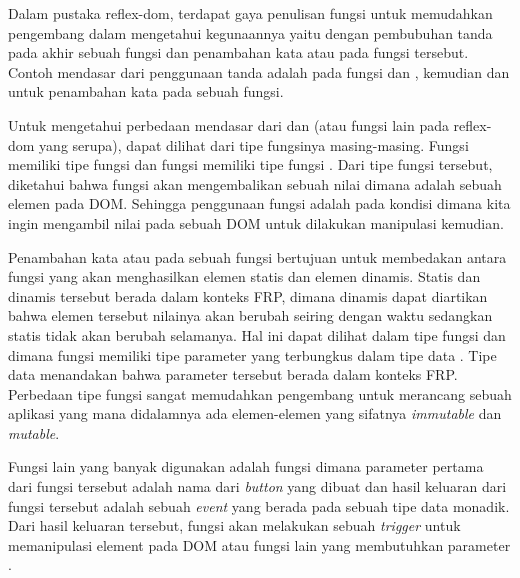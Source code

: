 \documentclass[pi.tex]{subfile}
\begin{document}
    \hspace{10pt}Dalam pustaka reflex-dom, terdapat gaya penulisan fungsi untuk memudahkan pengembang dalam mengetahui kegunaannya yaitu dengan pembubuhan tanda  pada akhir sebuah fungsi dan penambahan kata  atau  pada fungsi tersebut. Contoh mendasar dari penggunaan tanda  adalah pada fungsi  dan , kemudian  dan  untuk penambahan kata  pada sebuah fungsi.

    \hspace{10pt}Untuk mengetahui perbedaan mendasar dari  dan  (atau fungsi lain pada reflex-dom yang serupa), dapat dilihat dari tipe fungsinya masing-masing. Fungsi  memiliki tipe fungsi  dan fungsi  memiliki tipe fungsi . Dari tipe fungsi tersebut, diketahui bahwa fungsi  akan mengembalikan sebuah nilai  dimana  adalah sebuah elemen pada DOM. Sehingga penggunaan fungsi  adalah pada kondisi dimana kita ingin mengambil nilai  pada sebuah DOM untuk dilakukan manipulasi kemudian.

    \hspace{10pt}Penambahan kata  atau  pada sebuah fungsi bertujuan untuk membedakan antara fungsi yang akan menghasilkan elemen statis dan elemen dinamis. Statis dan dinamis tersebut berada dalam konteks FRP, dimana dinamis dapat diartikan bahwa elemen tersebut nilainya akan berubah seiring dengan waktu sedangkan statis tidak akan berubah selamanya. Hal ini dapat dilihat dalam tipe fungsi  dan  dimana fungsi  memiliki tipe parameter yang terbungkus dalam tipe data . Tipe data  menandakan bahwa parameter tersebut berada dalam konteks FRP. Perbedaan tipe fungsi sangat memudahkan pengembang untuk merancang sebuah aplikasi yang mana didalamnya ada elemen-elemen yang sifatnya \emph{immutable} dan \emph{mutable}.

    \hspace{10pt}Fungsi lain yang banyak digunakan adalah fungsi  dimana parameter pertama dari fungsi tersebut adalah nama dari \emph{button} yang dibuat dan hasil keluaran dari fungsi tersebut adalah sebuah \emph{event} yang berada pada sebuah tipe data monadik. Dari hasil keluaran tersebut, fungsi  akan melakukan sebuah \emph{trigger} untuk memanipulasi element pada DOM atau fungsi lain yang membutuhkan parameter .
\end{document}
